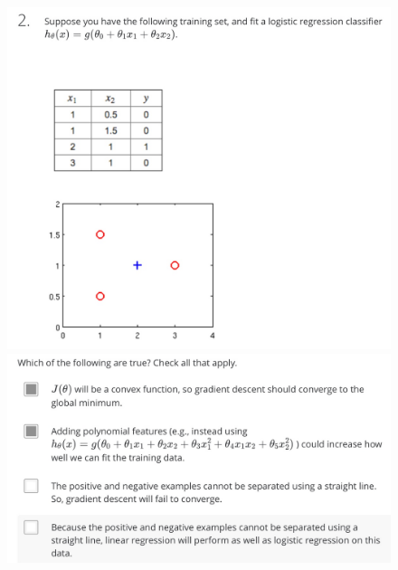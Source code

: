 \documentclass[12pt, A4,onecolumn]{article} %
\begin{document}
\begin{figure}[H]
  \includegraphics[width=\linewidth]{./Imagenes/testFLogicReg2_1}
\endminipage\hfill
{}
  \includegraphics[width=\linewidth]{./Imagenes/testFLogicReg2_2}
\endminipage\hfill
\end{figure}
\end{document}
